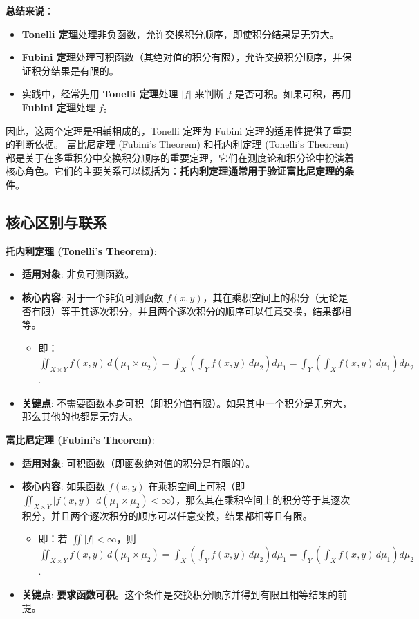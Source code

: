 \textbf{总结来说}：

\begin{itemize}
	\item \textbf{Tonelli 定理}处理非负函数，允许交换积分顺序，即使积分结果是无穷大。
	\item \textbf{Fubini 定理}处理可积函数（其绝对值的积分有限），允许交换积分顺序，并保证积分结果是有限的。
	\item 实践中，经常先用 \textbf{Tonelli 定理}处理 $|f|$ 来判断 $f$ 是否可积。如果可积，再用 \textbf{Fubini 定理}处理 $f$。
\end{itemize}

因此，这两个定理是相辅相成的，Tonelli 定理为 Fubini 定理的适用性提供了重要的判断依据。 富比尼定理 (Fubini's Theorem) 和托内利定理 (Tonelli's Theorem) 都是关于在多重积分中交换积分顺序的重要定理，它们在测度论和积分论中扮演着核心角色。它们的主要关系可以概括为：\textbf{托内利定理通常用于验证富比尼定理的条件}。

\subsection{核心区别与联系}

\textbf{托内利定理 (Tonelli's Theorem)}:

\begin{itemize}
	\item \textbf{适用对象}: 非负可测函数。
	\item \textbf{核心内容}: 对于一个非负可测函数 $f(x,y)$，其在乘积空间上的积分（无论是否有限）等于其逐次积分，并且两个逐次积分的顺序可以任意交换，结果都相等。
	\begin{itemize}
		\item 即：$\iint_{X \times Y} f(x,y) \,d(\mu_1 \times \mu_2) = \int_X \left( \int_Y f(x,y) \,d\mu_2 \right) d\mu_1 = \int_Y \left( \int_X f(x,y) \,d\mu_1 \right) d\mu_2$.
	\end{itemize}
	\item \textbf{关键点}: 不需要函数本身可积（即积分值有限）。如果其中一个积分是无穷大，那么其他的也都是无穷大。
\end{itemize}

\textbf{富比尼定理 (Fubini's Theorem)}:

\begin{itemize}
	\item \textbf{适用对象}: 可积函数（即函数绝对值的积分是有限的）。
	\item \textbf{核心内容}: 如果函数 $f(x,y)$ 在乘积空间上可积（即 $\iint_{X \times Y} |f(x,y)| \,d(\mu_1 \times \mu_2) < \infty$），那么其在乘积空间上的积分等于其逐次积分，并且两个逐次积分的顺序可以任意交换，结果都相等且有限。
	\begin{itemize}
		\item 即：若 $\iint |f| < \infty$，则 $\iint_{X \times Y} f(x,y) \,d(\mu_1 \times \mu_2) = \int_X \left( \int_Y f(x,y) \,d\mu_2 \right) d\mu_1 = \int_Y \left( \int_X f(x,y) \,d\mu_1 \right) d\mu_2$.
	\end{itemize}
	\item \textbf{关键点}: \textbf{要求函数可积}。这个条件是交换积分顺序并得到有限且相等结果的前提。
\end{itemize}

